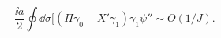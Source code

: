 \begin{equation}
  -\frac{\ii a}{2}\oint\dd \sigma
  [(\Pi\gamma_0-X'\gamma_1)\gamma_1\psi''
  \sim O(1/J).
\end{equation}

